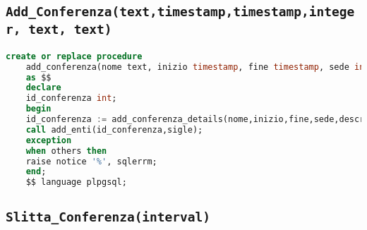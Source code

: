 \subsection{\texttt{Add\_Conferenza(text,timestamp,timestamp,integer, text, text)}}
\begin{lstlisting}[language=SQL,style=mystyle]
	create or replace procedure 
	add_conferenza(nome text, inizio timestamp, fine timestamp, sede integer, descrizione text, sigle text)
	as $$
	declare
	id_conferenza int;
	begin
	id_conferenza := add_conferenza_details(nome,inizio,fine,sede,descrizione);
	call add_enti(id_conferenza,sigle);
	exception
	when others then
	raise notice '%', sqlerrm;
	end;
	$$ language plpgsql;
\end{lstlisting}
\subsection{\texttt{Slitta\_Conferenza(interval)}}
